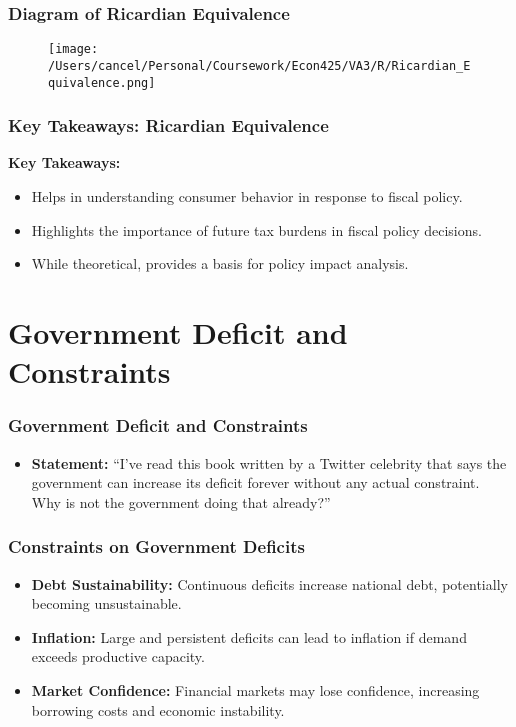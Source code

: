 \documentclass{beamer}
\begin{document}
\begin{frame}
    \frametitle{Diagram of Ricardian Equivalence}
    \begin{figure}[h!]
        \centering
        \texttt{[image: /Users/cancel/Personal/Coursework/Econ425/VA3/R/Ricardian\_Equivalence.png]}
    \end{figure}
\end{frame}

\begin{frame}
    \frametitle{Key Takeaways: Ricardian Equivalence}
    \textbf{Key Takeaways:}
    \begin{itemize}
        \item Helps in understanding consumer behavior in response to fiscal policy.
        \item Highlights the importance of future tax burdens in fiscal policy decisions.
        \item While theoretical, provides a basis for policy impact analysis.
    \end{itemize}
\end{frame}

\section{Government Deficit and Constraints}

\begin{frame}
    \frametitle{Government Deficit and Constraints}
    \begin{itemize}
        \item \textbf{Statement:} ``I've read this book written by a Twitter celebrity that says the government can increase its deficit forever without any actual constraint. Why is not the government doing that already?''
    \end{itemize}
\end{frame}

\begin{frame}
    \frametitle{Constraints on Government Deficits}
    \begin{itemize}
        \item \textbf{Debt Sustainability:} Continuous deficits increase national debt, potentially becoming unsustainable.
        \item \textbf{Inflation:} Large and persistent deficits can lead to inflation if demand exceeds productive capacity.
        \item \textbf{Market Confidence:} Financial markets may lose confidence, increasing borrowing costs and economic instability.
    \end{itemize}
\end{frame}
\end{document}

